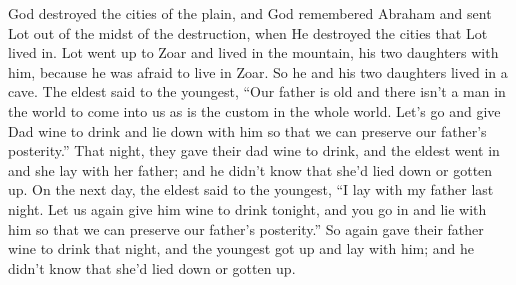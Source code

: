 \begin{inparaenum}
     God destroyed the cities of the plain, and God remembered Abraham and sent Lot out of the midst of the destruction, when He destroyed the cities that Lot lived in.%
     Lot went up to Zoar and lived in the mountain, his two daughters with him, because he was afraid to live in Zoar. So he and his two daughters lived in a cave.%
     The eldest said to the youngest, ``Our father is old and there isn't a man in the world to come into us as is the custom in the whole world.%
     Let's go and give Dad wine to drink and lie down with him so that we can preserve our father's posterity.''%
     That night, they gave their dad wine to drink, and the eldest went in and she lay with her father; and he didn't know that she'd lied down or gotten up.%
     On the next day, the eldest said to the youngest, ``I lay with my father last night. Let us again give him wine to drink tonight, and you go in and lie with him so that we can preserve our father's posterity.''%
     So again gave their father wine to drink that night, and the youngest got up and lay with him; and he didn't know that she'd lied down or gotten up.%
\end{inparaenum}
